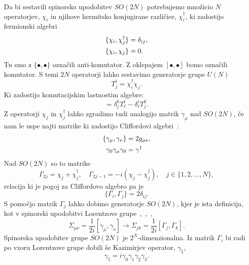 Da bi sestavili spinorsko upodobitev $SO(2N)$ potrebujemo množicio $N$ operatorjev, $\chi_i$
in njihove hermitsko konjugirane različice, $\chi_i^\dagger$, ki zadostijo fermionski
algebri~\cite{mohapatra}
\begin{align}
	\{\chi_i,\chi_j^\dagger\} &= \delta_{ij}, \notag \\
	\{\chi_i,\chi_j\} &= 0.
\end{align}
Tu smo z $\{\bullet,\bullet\}$ označili anti-komutator. Z oklepajem $[\bullet,\bullet]$ bomo
označili komutator. S temi $2N$ operatorji lahko sestavimo generatorje grupe $U(N)$
\begin{equation}
	T_j^i = \chi_i^\dagger \chi_j.
\end{equation}
Ki zadostijo komutacijskim lastnostim algebre:
\begin{equation}
	[T_j^i, T^k_\ell] = \delta^k_j T_\ell^i - \delta_\ell^i T_j^k.
\end{equation}
Z operatorji $\chi_j$ in $\chi_j^\dagger$ lahko zgradimo tudi analogijo matrik $\gamma_\mu$
nad $SO(2N)$, če nam le uspe najti matrike ki zadostijo Cliffordovi algebri~\cite{palash}:
\begin{align}
	\{\gamma_\mu,\gamma_\nu\} &= 2g_{\mu\nu}, \notag \\
	\gamma_0 \gamma_\mu \gamma_0 &= \gamma^\dagger
\end{align}
Nad $SO(2N)$ so to matrike~\cite{mohapatra}
\begin{equation}
	\Gamma_{2j} = \chi_j + \chi_j^\dagger, \quad \Gamma_{2j-1} = -i(\chi_j - \chi_j^\dagger), \quad
		j \in \{1,2,\ldots,N\},
\end{equation}
relacija ki je pogoj za Cliffordovo algebro pa je~\cite{mohapatra}
\begin{equation}
	\{\Gamma_i,\Gamma_j\} = 2\delta_{ij}.
\end{equation}
S pomočjo matrik $\Gamma_j$ lahko dobimo generatorje $SO(2N)$, kjer je ista definicija, kot v spinorski
upodobitvi Lorentzove grupe~\cite{mohapatra},~\cite{palash},~\cite{quang},
\begin{equation}
	\Sigma_{\mu\nu} = \frac{1}{2i}[\gamma_\mu,\gamma_\nu] \longrightarrow
		\Sigma_{jk} = \frac{1}{2i}[\Gamma_j,\Gamma_k].
	\label{genratorji}
\end{equation}
Spinorska upodobitev grupe $SO(2N)$ je $2^N$-dimenzionalna. Iz matrik $\Gamma_i$ bi radi po vzoru
Lorentzove grupe dobili še Kazimirjev operator, $\gamma_5$,
\begin{equation}
	\gamma_5 = i\gamma_0\gamma_1\gamma_2\gamma_3.
\end{equation}

